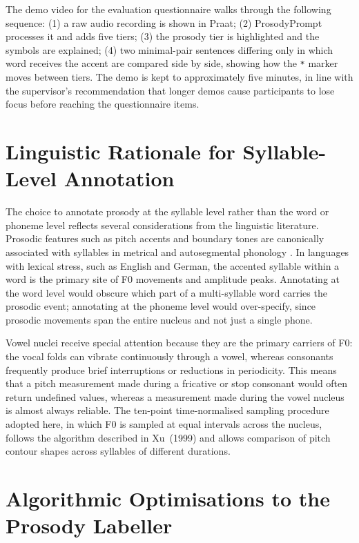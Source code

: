 The demo video for the evaluation questionnaire walks through the following
sequence: (1) a raw audio recording is shown in Praat; (2) ProsodyPrompt
processes it and adds five tiers; (3) the prosody tier is highlighted and the
symbols are explained; (4) two minimal-pair sentences differing only in which
word receives the accent are compared side by side, showing how the \texttt{*}
marker moves between tiers. The demo is kept to approximately five minutes, in
line with the supervisor's recommendation that longer demos cause participants
to lose focus before reaching the questionnaire items.

\section{Linguistic Rationale for Syllable-Level Annotation}
\label{sec:linguistic_rationale}

The choice to annotate prosody at the syllable level rather than the word or
phoneme level reflects several considerations from the linguistic literature.
Prosodic features such as pitch accents and boundary tones are canonically
associated with syllables in metrical and autosegmental phonology
\cite{ladd2008intonational, beckman2006tobi}. In languages with lexical stress,
such as English and German, the accented syllable within a word is the primary
site of F0 movements and amplitude peaks. Annotating at the word level would
obscure which part of a multi-syllable word carries the prosodic event; annotating
at the phoneme level would over-specify, since prosodic movements span the entire
nucleus and not just a single phone.

Vowel nuclei receive special attention because they are the primary carriers of
F0: the vocal folds can vibrate continuously through a vowel, whereas consonants
frequently produce brief interruptions or reductions in periodicity. This means
that a pitch measurement made during a fricative or stop consonant would often
return undefined values, whereas a measurement made during the vowel nucleus is
almost always reliable. The ten-point time-normalised sampling procedure adopted
here, in which F0 is sampled at equal intervals across the nucleus, follows the
algorithm described in Xu~(1999) \cite{xu1999} and allows comparison of pitch
contour shapes across syllables of different durations.

\section{Algorithmic Optimisations to the Prosody Labeller}
\label{sec:optimisations}

